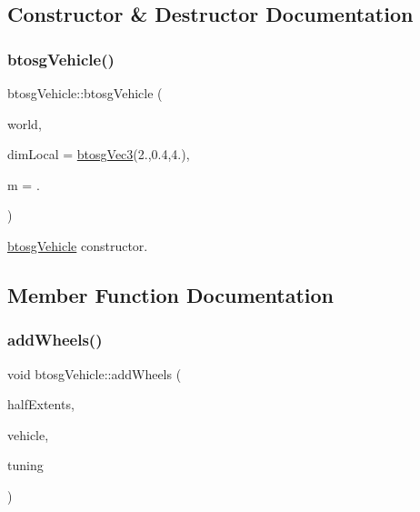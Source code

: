 \subsection{Constructor \& Destructor Documentation}
\mbox{\label{classbtosgVehicle_aa754dd94553b8690763e4c24d1f26227}} 
\subsubsection{\texorpdfstring{btosg\+Vehicle()}{btosgVehicle()}}
{\footnotesize\ttfamily btosg\+Vehicle\+::btosg\+Vehicle (\begin{DoxyParamCaption}\item[{\hyperlink{classbtosgWorld}{btosg\+World} $\ast$}]{world,  }\item[{\hyperlink{classbtosgVec3}{btosg\+Vec3}}]{dim\+Local = {\ttfamily \hyperlink{classbtosgVec3}{btosg\+Vec3}(2.,0.4,4.)},  }\item[{double}]{m = {.} }\end{DoxyParamCaption})\hspace{0.3cm}{\ttfamily [inline]}}

\hyperlink{classbtosgVehicle}{btosg\+Vehicle} constructor. 

\subsection{Member Function Documentation}
\mbox{\label{classbtosgVehicle_a98971fb952c08cb72341a0c333fc66de}} 
\subsubsection{\texorpdfstring{add\+Wheels()}{addWheels()}}
{\footnotesize\ttfamily void btosg\+Vehicle\+::add\+Wheels (\begin{DoxyParamCaption}\item[{bt\+Vector3 $\ast$}]{half\+Extents,  }\item[{bt\+Raycast\+Vehicle $\ast$}]{vehicle,  }\item[{bt\+Raycast\+Vehicle\+::bt\+Vehicle\+Tuning}]{tuning }\end{DoxyParamCaption})\hspace{0.3cm}{\ttfamily [inline]}}


